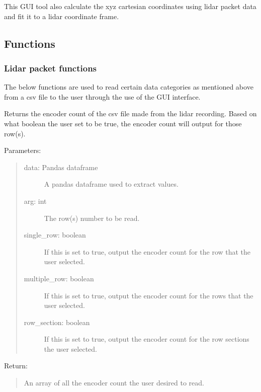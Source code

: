 \documentclass[letterpaper,10pt,english]{sphinxmanual}
\begin{document}
This GUI tool also calculate the xyz cartesian coordinates using lidar packet data and fit it to a lidar coordinate frame.


\subsection{Functions}
\label{\detokenize{Lidar extraction tool:functions}}

\subsubsection{Lidar packet functions}
\label{\detokenize{Lidar extraction tool:lidar-packet-functions}}
The below functions are used to read certain data categories as mentioned above from a csv file to the user through the use of the GUI interface.

\label{\detokenize{Lidar extraction tool:module-lidar_extract}}

\begin{fulllineitems}
\label{\detokenize{Lidar extraction tool:lidar_extract.get_encoder_count}}
Returns the encoder count of the csv file made from the lidar recording. Based on what boolean the user set to be true,
the encoder count will output for those row(s).

Parameters:
\begin{quote}
\begin{description}
\item[{data: Pandas dataframe}] \leavevmode
A pandas dataframe used to extract values.

\item[{arg: int}] \leavevmode
The row(s) number to be read.

\item[{single\_row: boolean}] \leavevmode
If this is set to true, output the encoder count for the row that the user selected.

\item[{multiple\_row: boolean}] \leavevmode
If this is set to true, output the encoder count for the rows that the user selected.

\item[{row\_section: boolean}] \leavevmode
If this is set to true, output the encoder count for the row sections the user selected.

\end{description}
\end{quote}

Return:
\begin{quote}

An array of all the encoder count the user desired to read.
\end{quote}

\end{fulllineitems}
\end{document}
